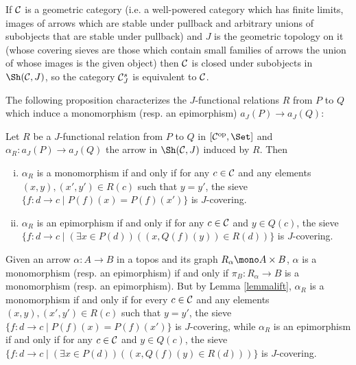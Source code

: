 \documentclass[a4paper,12pt]{article}
\begin{document}
\begin{remark}\label{remsubcanonicalclosedsubobjects}
	If $\cal C$ is a geometric category (i.e. a well-powered category which has finite limits, images of arrows which are stable under pullback and arbitrary unions of subobjects that are stable under pullback) and $J$ is the geometric topology on it (whose covering sieves are those which contain small families of arrows the union of whose images is the given object) then $\cal C$ is closed under subobjects in $\Sh({\cal C}, J)$, so the category ${\cal C}_{J}^{s}$ is equivalent to $\cal C$. 
\end{remark}


The following proposition characterizes the $J$-functional relations $R$ from $P$ to $Q$ which induce a monomorphism (resp. an epimorphism) $a_{J}(P)\to a_{J}(Q)$:

\begin{proposition}\label{propfunctionalrelationmonoepi}
	Let $R$ be a $J$-functional relation from $P$ to $Q$ in $[{\cal C}^{\textup{op}}, \Set]$ and $\alpha_{R}:a_{J}(P)\to a_{J}(Q)$ the arrow in $\Sh({\cal C}, J)$ induced by $R$. Then 
	\begin{enumerate}[(i)]
		\item  $\alpha_{R}$ is a monomorphism if and only if for any $c\in {\cal C}$ and any elements $(x,y), (x',y')\in R(c)$ such that $y=y'$, the sieve $\{f:d\to c \mid P(f)(x)=P(f)(x')\}$ is $J$-covering.
		
		\item  $\alpha_{R}$ is an epimorphism if and only if for any $c\in {\cal C}$ and $y\in Q(c)$, the sieve $\{f:d\to c \mid (\exists x\in P(d))((x, Q(f)(y))\in R(d))\}$ is $J$-covering.
	\end{enumerate}
\end{proposition}

\begin{proofs}
	Given an arrow $\alpha:A\to B$ in a topos and its graph $R_{\alpha}\mono A\times B$, $\alpha$ is a monomorphism (resp. an epimorphism) if and only if $\pi_{B}:R_{\alpha}\to B$ is a monomorphism (resp. an epimorphism).
	But by Lemma \ref{lemmalift}, $\alpha_{R}$ is a monomorphism if and only if 
	for every $c\in {\cal C}$ and any elements $(x,y), (x',y')\in R(c)$ such that $y=y'$, the sieve $\{f:d\to c \mid P(f)(x)=P(f)(x')\}$ is $J$-covering, while $\alpha_{R}$ is an epimorphism if and only if for any $c\in {\cal C}$ and $y\in Q(c)$, the sieve $\{f:d\to c \mid (\exists x\in P(d))((x, Q(f)(y)\in R(d))) \}$ is $J$-covering.  
\end{proofs}
\end{document}
